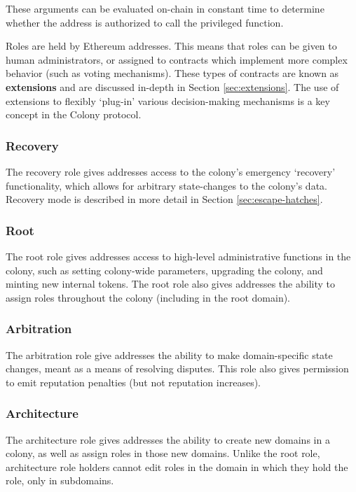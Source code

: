 These arguments can be evaluated on-chain in constant time to determine whether the address is authorized to call the privileged function.

Roles are held by Ethereum addresses. This means that roles can be given to human administrators, or assigned to contracts which implement more complex behavior (such as voting mechanisms). These types of contracts are known as \textbf{extensions} and are discussed in-depth in Section \ref{sec:extensions}. The use of extensions to flexibly `plug-in' various decision-making mechanisms is a key concept in the Colony protocol.

\subsubsection*{Recovery}

The recovery role gives addresses access to the colony's emergency `recovery' functionality, which allows for arbitrary state-changes to the colony's data. Recovery mode is described in more detail in Section \ref{sec:escape-hatches}.

\subsubsection*{Root}

The root role gives addresses access to high-level administrative functions in the colony, such as setting colony-wide parameters, upgrading the colony, and minting new internal tokens. The root role also gives addresses the ability to assign roles throughout the colony (including in the root domain).

\subsubsection*{Arbitration}

The arbitration role give addresses the ability to make domain-specific state changes, meant as a means of resolving disputes. This role also gives permission to emit reputation penalties (but not reputation increases).

\subsubsection*{Architecture}

The architecture role gives addresses the ability to create new domains in a colony, as well as assign roles in those new domains. Unlike the root role, architecture role holders cannot edit roles in the domain in which they hold the role, only in subdomains.

